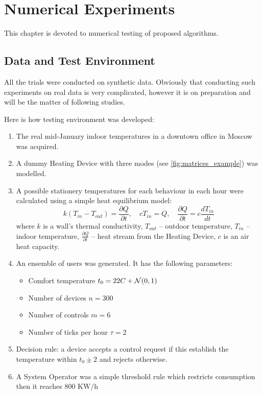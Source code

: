 \chapter{Numerical Experiments}
This chapter is devoted to numerical testing of proposed algorithms. 

\section{Data and Test Environment}
\label{sec:emulator}
All the trials were conducted on synthetic data. Obviously that conducting such experiments on real data is very complicated, however it is on preparation and will be the matter of following studies. 

Here is how testing environment was developed:
\begin{enumerate}
    \item The real mid-January indoor temperatures in a downtown office in Moscow was acquired. 
    \item A dummy Heating Device with three modes (see \ref{fig:matrices_example}) was modelled.
    \item A possible stationery temperatures for each behaviour in each hour were calculated using a simple heat equilibrium model:
        \[ 
            k(T_{in} - T_{out}) = \frac{\partial Q}{\partial t}, \quad
            cT_{in} = Q,\quad \frac{\partial Q}{\partial t} = c \frac{d T_{in}}{dt}
        \]
        where $k$ is a wall's thermal conductivity, $T_{out}$ -- outdoor temperature, $T_{in}$ -- indoor temperature, $\frac{\partial Q}{\partial t}$ -- heat stream from the Heating Device, $c$ is an air heat capacity. 
    \item An ensemble of users was generated. It has the following parameters:
        \begin{itemize}
            \item Comfort temperature $t_0 = 22 C +  \operatorname{\mathcal{N}}(0, 1)$ 
            \item Number of devices $n = 300$
            \item Number of controls $m = 6$
            \item Number of ticks per hour $\tau = 2$
        \end{itemize}
    \item Decision rule: a device accepts a control request if this establish the temperature within $t_0 \pm 2$ and rejects otherwise.
    \item A System Operator was a simple threshold rule which restricts consumption then it reaches $800 \text{ KW/h}$
        
\end{enumerate}

